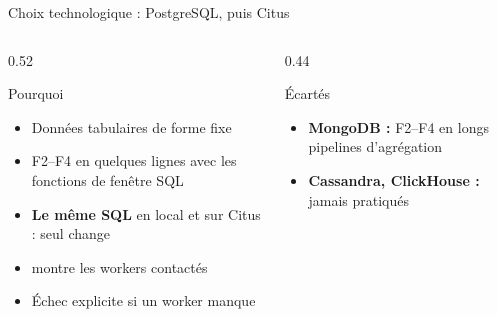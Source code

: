 \documentclass[aspectratio=169]{pres}
\begin{document}
\begin{frame}{Choix technologique : PostgreSQL, puis Citus}
  \begin{columns}[T]
    \begin{column}{0.52\textwidth}
      \begin{block}{Pourquoi}
        \begin{itemize}
          \item Données tabulaires de forme fixe
          \item F2--F4 en quelques lignes avec les fonctions de fenêtre SQL
          \item \textbf{Le même SQL} en local et sur Citus : seul  change
          \item {} montre les workers contactés
          \item Échec explicite si un worker manque
        \end{itemize}
      \end{block}
    \end{column}
    \begin{column}{0.44\textwidth}
      \begin{block}{Écartés}
        \small
        \begin{itemize}
          \item \textbf{MongoDB :} F2--F4 en longs pipelines d'agrégation
          \item \textbf{Cassandra, ClickHouse :} jamais pratiqués
        \end{itemize}
      \end{block}
    \end{column}
  \end{columns}
\end{frame}
\end{document}
